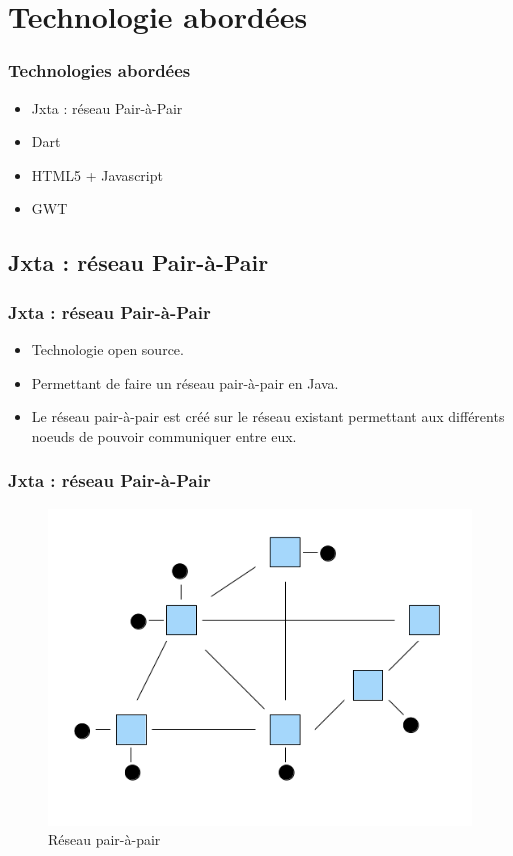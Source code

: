 \section{Technologie abordées}
  \begin{frame}
    \frametitle{Technologies abordées}
    \begin{itemize}
      \item Jxta : réseau Pair-à-Pair
      \item Dart
      \item HTML5 + Javascript
      \item GWT
    \end{itemize}
  \end{frame}

  \subsection*{Jxta : réseau Pair-à-Pair}
    \begin{frame}
      \frametitle{Jxta : réseau Pair-à-Pair}
      \begin{itemize}
        \item Technologie open source.
        \item Permettant de faire un réseau	pair-à-pair en Java. 
        \item Le  réseau pair-à-pair est créé sur le réseau existant permettant aux différents noeuds de pouvoir communiquer entre eux.\\
      \end{itemize}
    \end{frame}
    
    \begin{frame}
      \frametitle{Jxta : réseau Pair-à-Pair}
      	\begin{figure}
			\includegraphics[scale=0.3]{includes/network-model.png}
			\caption{Réseau pair-à-pair}
	   	\end{figure}
    \end{frame}

